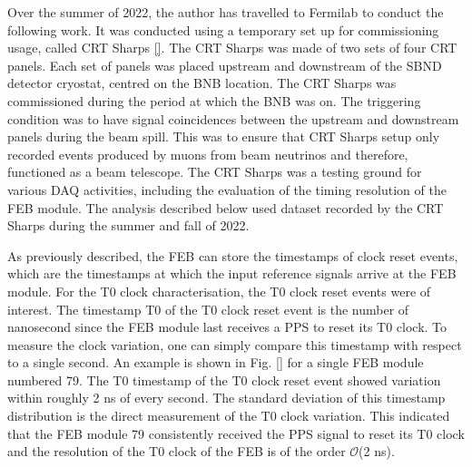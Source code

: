 Over the summer of 2022, the author has travelled to Fermilab to conduct the following work.
It was conducted using a temporary set up for commissioning usage, called CRT Sharps \ref{}.
The CRT Sharps was made of two sets of four CRT panels. 
Each set of panels was placed upstream and downstream of the SBND detector cryostat, centred on the BNB location.
The CRT Sharps was commissioned during the period at which the BNB was on. 
The triggering condition was to have signal coincidences between the upstream and downstream panels during the beam spill.
This was to ensure that CRT Sharps setup only recorded events produced by muons from beam neutrinos and therefore, functioned as a beam telescope.
The CRT Sharps was a testing ground for various DAQ activities, including the evaluation of the timing resolution of the FEB module. 
The analysis described below used dataset recorded by the CRT Sharps during the summer and fall of 2022.


As previously described, the FEB can store the timestamps of clock reset events, which are the timestamps at which the input reference signals arrive at the FEB module.
For the T0 clock characterisation, the T0 clock reset events were of interest.
The timestamp T0 of the T0 clock reset event is the number of nanosecond since the FEB module last receives a PPS to reset its T0 clock.
To measure the clock variation, one can simply compare this timestamp with respect to a single second.
An example is shown in Fig. \ref{} for a single FEB module numbered 79.
The T0 timestamp of the T0 clock reset event showed variation within roughly 2 ns of every second. 
The standard deviation of this timestamp distribution is the direct measurement of the T0 clock variation.
This indicated that the FEB module 79 consistently received the PPS signal to reset its T0 clock and the resolution of the T0 clock of the FEB is of the order $\mathcal{O}$(2 ns).



